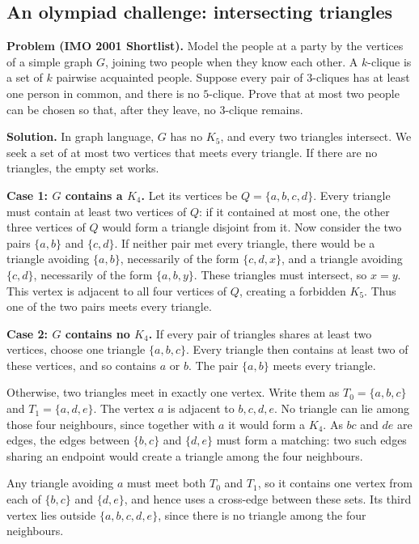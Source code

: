 \subsection*{An olympiad challenge: intersecting triangles}
\Challenge{} \textbf{Problem (IMO 2001 Shortlist).} Model the people at a party by the vertices of a simple graph $G$, joining two people when they know each other. A $k$-clique is a set of $k$ pairwise acquainted people. Suppose every pair of $3$-cliques has at least one person in common, and there is no $5$-clique. Prove that at most two people can be chosen so that, after they leave, no $3$-clique remains.

\textbf{Solution.} In graph language, $G$ has no $K_5$, and every two triangles intersect. We seek a set of at most two vertices that meets every triangle. If there are no triangles, the empty set works.

\textbf{Case 1: $G$ contains a $K_4$.} Let its vertices be $Q=\{a,b,c,d\}$. Every triangle must contain at least two vertices of $Q$: if it contained at most one, the other three vertices of $Q$ would form a triangle disjoint from it. Now consider the two pairs $\{a,b\}$ and $\{c,d\}$. If neither pair met every triangle, there would be a triangle avoiding $\{a,b\}$, necessarily of the form $\{c,d,x\}$, and a triangle avoiding $\{c,d\}$, necessarily of the form $\{a,b,y\}$. These triangles must intersect, so $x=y$. This vertex is adjacent to all four vertices of $Q$, creating a forbidden $K_5$. Thus one of the two pairs meets every triangle.

\textbf{Case 2: $G$ contains no $K_4$.} If every pair of triangles shares at least two vertices, choose one triangle $\{a,b,c\}$. Every triangle then contains at least two of these vertices, and so contains $a$ or $b$. The pair $\{a,b\}$ meets every triangle.

Otherwise, two triangles meet in exactly one vertex. Write them as $T_0=\{a,b,c\}$ and $T_1=\{a,d,e\}$. The vertex $a$ is adjacent to $b,c,d,e$. No triangle can lie among those four neighbours, since together with $a$ it would form a $K_4$. As $bc$ and $de$ are edges, the edges between $\{b,c\}$ and $\{d,e\}$ must form a matching: two such edges sharing an endpoint would create a triangle among the four neighbours.

Any triangle avoiding $a$ must meet both $T_0$ and $T_1$, so it contains one vertex from each of $\{b,c\}$ and $\{d,e\}$, and hence uses a cross-edge between these sets. Its third vertex lies outside $\{a,b,c,d,e\}$, since there is no triangle among the four neighbours.

